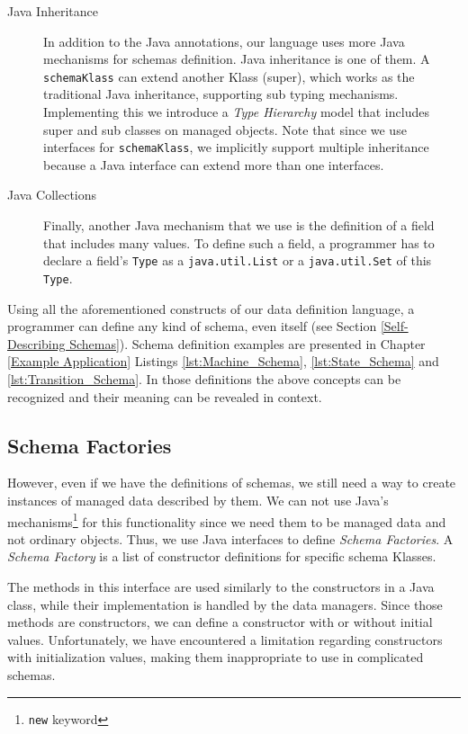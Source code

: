 \begin{description}
	\item [Java Inheritance] In addition to the Java annotations, our language uses more Java mechanisms for schemas definition. 
	Java inheritance is one of them. 
	A \texttt{schemaKlass} can extend another Klass (super), which works as the traditional Java inheritance, supporting sub typing mechanisms.
	Implementing this we introduce a \textit{Type Hierarchy} model that includes super and sub classes on managed objects.
	Note that since we use interfaces for \texttt{schemaKlass}, we implicitly support multiple inheritance because a Java interface can extend more than one interfaces.

	\item [Java Collections] Finally, another Java mechanism that we use is the definition of a field that includes many values.
	To define such a field, a programmer has to declare a field's \texttt{Type} as a \texttt{java.util.List} or a \texttt{java.util.Set} of this \texttt{Type}.

\end{description}

Using all the aforementioned constructs of our data definition language, a programmer can define any kind of schema, even itself (see Section \ref{Self-Describing Schemas}).
Schema definition examples are presented in Chapter \ref{Example Application} Listings \ref{lst:Machine_Schema}, \ref{lst:State_Schema} and \ref{lst:Transition_Schema}.
In those definitions the above concepts can be recognized and their meaning can be revealed in context.

\subsection{Schema Factories}\label{Schema Factories}
However, even if we have the definitions of schemas, we still need a way to create instances of managed data described by them.
We can not use Java's mechanisms\footnote{\texttt{new} keyword} for this functionality since we need them to be managed data and not ordinary objects.
Thus, we use Java interfaces to define \textit{Schema Factories}.
A \textit{Schema Factory} is a list of constructor definitions for specific schema Klasses.

The methods in this interface are used similarly to the constructors in a Java class, while their implementation is handled by the data managers.
Since those methods are constructors, we can define a constructor with or without initial values.
Unfortunately, we have encountered a limitation regarding constructors with initialization values, making them inappropriate to use in complicated schemas.

